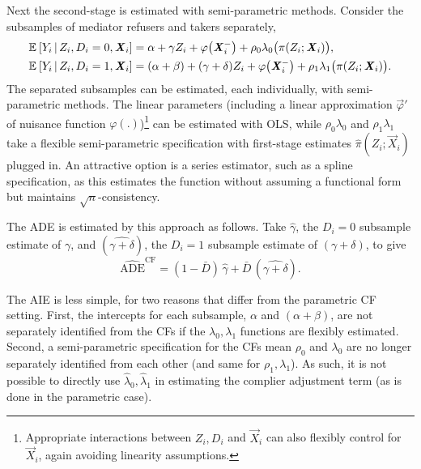 Next the second-stage is estimated with semi-parametric methods.
Consider the subsamples of mediator refusers and takers separately,
\begin{align*}
    \mathbb{E}_{} \left[ Y_i \, \middle\vert \, Z_i, D_i = 0, \boldsymbol{\mathit{X}}_i \right] &=
        \alpha + \gamma Z_i + \varphi\big( \boldsymbol{\mathit{X}}_i^- \big)
        + \rho_0 \lambda_0 \big( \pi(Z_i ; \boldsymbol{\mathit{X}}_i) \big), \\
    \mathbb{E}_{} \left[ Y_i \, \middle\vert \, Z_i, D_i = 1, \boldsymbol{\mathit{X}}_i \right] &=
        (\alpha + \beta) + (\gamma + \delta) Z_i + \varphi\big( \boldsymbol{\mathit{X}}_i^- \big)
        + \rho_1 \lambda_1 \big( \pi(Z_i ; \boldsymbol{\mathit{X}}_i) \big).
\end{align*}
The separated subsamples can be estimated, each individually, with semi-parametric methods.
The linear parameters (including a linear approximation $\vec \varphi'$ of nuisance function $\varphi(.)$)\footnote{
    Appropriate interactions between $Z_i, D_i$ and $\vec X_i$ can also flexibly control for $\vec X_i$, again avoiding linearity assumptions.
} can be estimated with OLS, while $\rho_0 \lambda_0$ and $\rho_1 \lambda_1$ take a flexible semi-parametric specification with first-stage estimates $\hat \pi(Z_i; \vec X_i)$ plugged in.
An attractive option is a series estimator, such as a spline specification, as this estimates the function without assuming a functional form but maintains $\sqrt n$-consistency.

The ADE is estimated by this approach as follows.
Take $\hat \gamma$, the $D_i = 0$ subsample estimate of $\gamma$, and $(\hat{\gamma + \delta})$, the $D_i = 1$ subsample estimate of $(\gamma + \delta)$, to give
\[ \hat{\text{ADE}}^{\text{CF}}
    = (1 - \bar D) \, \hat \gamma + \bar D \, (\hat{\gamma + \delta}). \]

The AIE is less simple, for two reasons that differ from the parametric CF setting.
First, the intercepts for each subsample, $\alpha$ and $(\alpha + \beta)$, are not separately identified from the CFs if the $\lambda_0, \lambda_1$ functions are flexibly estimated.
Second, a semi-parametric specification for the CFs mean $\rho_0$ and $\lambda_0$ are no longer separately identified from each other (and same for $\rho_1,\lambda_1$).
As such, it is not possible to directly use $\hat \lambda_0, \hat \lambda_1$ in estimating the complier adjustment term (as is done in the parametric case).

